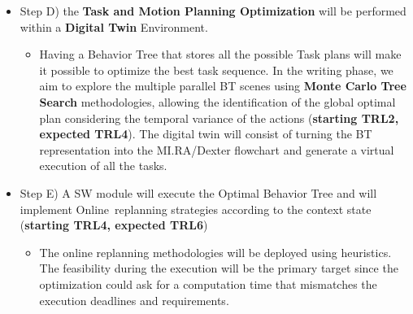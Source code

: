 \begin{itemize}
  \begin{itemize}
  \item
    At the state of the art, many solvers compute the best task plan
    given the time duration of the tasks. However, no temporal planner
    is still available off-the-shelves that also considers the variance
    in the duration of the tasks, and a few papers are dedicated to this
    issue. Since such a solver is out of the competence of the working
    team, we will follow an alternative path. We will translate the PDDL
    into a behavior tree using time variability to allow a search for
    the best solution over the behavior tree (see next point). This SW
    module will exploit STNU (Simple Temporal Network \textbf{with}
    Uncertainty) and consist of the straightforward extension of
    existing tools that turn PDDL into a Simple Temporal Network
    \textbf{without} Uncertainty (\textbf{starting TRL4, expected
    TRL6}).
  \end{itemize}
\item
  Step D) the \textbf{Task and Motion Planning Optimization} will be
  performed within a \textbf{Digital Twin} Environment.

  \begin{itemize}
  \item
    Having a Behavior Tree that stores all the possible Task plans will
    make it possible to optimize the best task sequence. In the writing
    phase, we aim to explore the multiple parallel BT scenes using
    \textbf{Monte Carlo Tree Search} methodologies, allowing the
    identification of the global optimal plan considering the temporal
    variance of the actions (\textbf{starting TRL2, expected TRL4}). The
    digital twin will consist of turning the BT representation into the
    MI.RA/Dexter flowchart and generate a virtual execution of all the
    tasks.
  \end{itemize}
\item
  Step E) A SW module will execute the Optimal Behavior Tree and will
  implement Online~replanning strategies according to the context state
  (\textbf{starting TRL4, expected TRL6})

  \begin{itemize}
  \item
    The online replanning methodologies will be deployed using
    heuristics. The feasibility during the execution will be the primary
    target since the optimization could ask for a computation time that
    mismatches the execution deadlines and requirements.
  \end{itemize}
\end{itemize}

